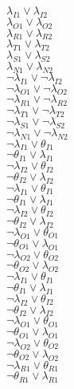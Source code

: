 $\lambda_{I1} \vee \lambda_{I2}$\\
$\lambda_{O1} \vee \lambda_{O2}$\\
$\lambda_{R1} \vee \lambda_{R2}$\\
$\lambda_{T1} \vee \lambda_{T2}$\\
$\lambda_{S1} \vee \lambda_{S2}$\\
$\lambda_{N1} \vee \lambda_{N2}$\\
$\neg\lambda_{I1} \vee \neg\lambda_{I2}$\\
$\neg\lambda_{O1} \vee \neg\lambda_{O2}$\\
$\neg\lambda_{R1} \vee \neg\lambda_{R2}$\\
$\neg\lambda_{T1} \vee \neg\lambda_{T2}$\\
$\neg\lambda_{S1} \vee \neg\lambda_{S2}$\\
$\neg\lambda_{N1} \vee \neg\lambda_{N2}$\\
$\neg\lambda_{I1} \vee \theta_{I1}$\\
$\neg\theta_{I1} \vee \lambda_{I1}$\\
$\neg\lambda_{I2} \vee \theta_{I2}$\\
$\neg\theta_{I2} \vee \lambda_{I2}$\\
$\neg\lambda_{I1} \vee \theta_{I1}$\\
$\neg\theta_{I1} \vee \lambda_{I1}$\\
$\neg\lambda_{I2} \vee \theta_{I2}$\\
$\neg\theta_{I2} \vee \lambda_{I2}$\\
$\neg\lambda_{O1} \vee \theta_{O1}$\\
$\neg\theta_{O1} \vee \lambda_{O1}$\\
$\neg\lambda_{O2} \vee \theta_{O2}$\\
$\neg\theta_{O2} \vee \lambda_{O2}$\\
$\neg\lambda_{I1} \vee \theta_{I1}$\\
$\neg\theta_{I1} \vee \lambda_{I1}$\\
$\neg\lambda_{I2} \vee \theta_{I2}$\\
$\neg\theta_{I2} \vee \lambda_{I2}$\\
$\neg\lambda_{O1} \vee \theta_{O1}$\\
$\neg\theta_{O1} \vee \lambda_{O1}$\\
$\neg\lambda_{O2} \vee \theta_{O2}$\\
$\neg\theta_{O2} \vee \lambda_{O2}$\\
$\neg\lambda_{R1} \vee \theta_{R1}$\\
$\neg\theta_{R1} \vee \lambda_{R1}$\\
